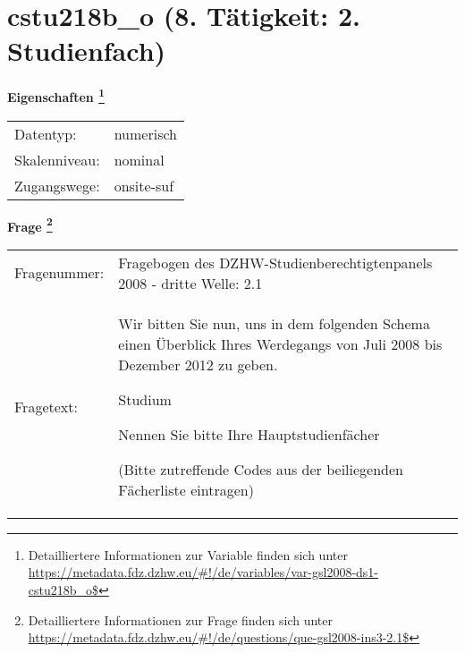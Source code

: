 
    \setcounter{footnote}{0}

    \vspace*{-1.8cm}
	\section{cstu218b\_o (8. Tätigkeit: 2. Studienfach)}
	\label{section:cstu218b_o}



    \vspace*{0.5cm}
    \noindent\textbf{Eigenschaften
	\footnote{Detailliertere Informationen zur Variable finden sich unter
		\url{https://metadata.fdz.dzhw.eu/\#!/de/variables/var-gsl2008-ds1-cstu218b_o$}}}\\
	\begin{tabularx}{\hsize}{@{}lX}
	Datentyp: & numerisch \\
	Skalenniveau: & nominal \\
	Zugangswege: &
	  onsite-suf
 \\
    \end{tabularx}



				\vspace*{0.5cm}
                \noindent\textbf{Frage
	                \footnote{Detailliertere Informationen zur Frage finden sich unter
		              \url{https://metadata.fdz.dzhw.eu/\#!/de/questions/que-gsl2008-ins3-2.1$}}}\\
				\begin{tabularx}{\hsize}{@{}lX}
					Fragenummer: &
					  Fragebogen des DZHW-Studienberechtigtenpanels 2008 - dritte Welle:
					  2.1
 \\
					Fragetext: & Wir bitten Sie nun, uns in dem folgenden Schema einen Überblick Ihres Werdegangs von Juli 2008 bis Dezember 2012 zu geben.\par  Studium\par  Nennen Sie bitte Ihre Hauptstudienfächer\par  (Bitte zutreffende Codes aus der beiliegenden Fächerliste eintragen) \\
				\end{tabularx}





